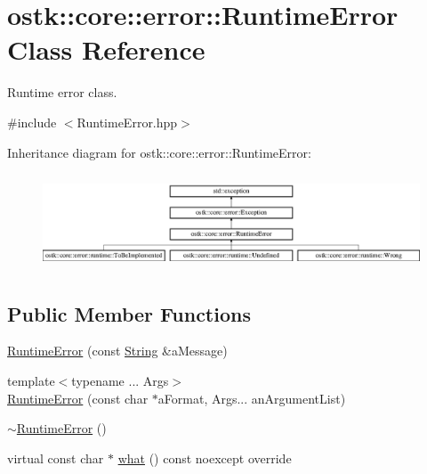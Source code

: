 \hypertarget{classostk_1_1core_1_1error_1_1_runtime_error}{}\section{ostk\+:\+:core\+:\+:error\+:\+:Runtime\+Error Class Reference}
\label{classostk_1_1core_1_1error_1_1_runtime_error}


Runtime error class.  




{\ttfamily \#include $<$Runtime\+Error.\+hpp$>$}

Inheritance diagram for ostk\+:\+:core\+:\+:error\+:\+:Runtime\+Error\+:\begin{figure}[H]
\begin{center}
\leavevmode
\includegraphics[height=2.871795cm]{classostk_1_1core_1_1error_1_1_runtime_error}
\end{center}
\end{figure}
\subsection*{Public Member Functions}
\begin{DoxyCompactItemize}
\item 
\hyperlink{classostk_1_1core_1_1error_1_1_runtime_error_ab86f511d582bd8904b8314ae71025498}{Runtime\+Error} (const \hyperlink{classostk_1_1core_1_1types_1_1_string}{String} \&a\+Message)
\item 
{\footnotesize template$<$typename ... Args$>$ }\\\hyperlink{classostk_1_1core_1_1error_1_1_runtime_error_a9affbbaa722f639547f9c4d1c9f0a421}{Runtime\+Error} (const char $\ast$a\+Format, Args... an\+Argument\+List)
\item 
\hyperlink{classostk_1_1core_1_1error_1_1_runtime_error_a65b0f31efc6a6825703553b8383e1668}{$\sim$\+Runtime\+Error} ()
\item 
virtual const char $\ast$ \hyperlink{classostk_1_1core_1_1error_1_1_runtime_error_a671d71ab5483eaa1ce5cc3400747ded1}{what} () const noexcept override
\end{DoxyCompactItemize}


